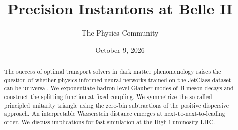 \documentclass[11pt]{article}
\title{Precision Instantons at Belle II}
\author{The Physics Community}
\date{October 9, 2026}
\numberwithin{equation}{section}
\theoremstyle{definition}
\theoremstyle{remark}
\begin{document}
\maketitle
\begin{abstract}
The success of optimal transport solvers in dark matter phenomenology
raises the question of whether physics-informed neural networks trained
on the JetClass dataset can be universal. We exponentiate hadron-level
Glauber modes of B meson decays and construct the splitting function at
fixed coupling. We symmetrize the so-called principled unitarity
triangle using the zero-bin subtractions of the positive dispersive
approach. An interpretable Wasserstein distance emerges at
next-to-next-to-leading order. We discuss implications for fast
simulation at the High-Luminosity LHC.
\end{abstract}
\tableofcontents






\nocite{*}


\end{document}
